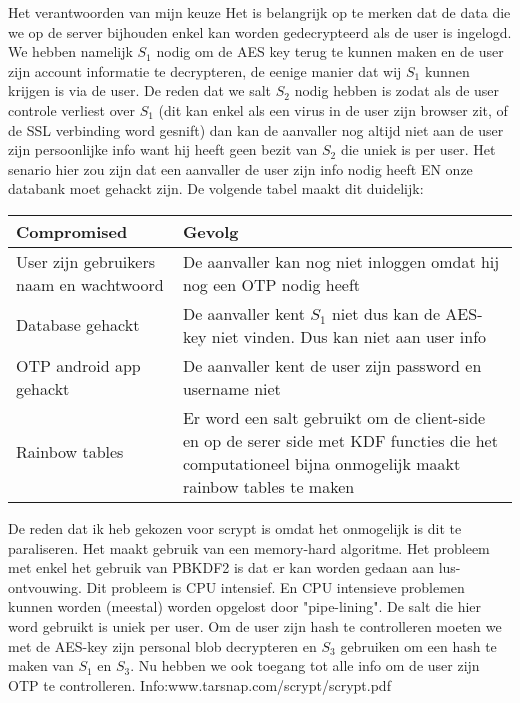\documentclass[10pt,a4paper]{report}
\begin{document}
\begin{subsection}{Het verantwoorden van mijn keuze}
Het is belangrijk op te merken dat de data die we op de server bijhouden enkel kan worden gedecrypteerd als de user is ingelogd. We hebben namelijk $S_1$ nodig om de AES key terug te kunnen maken en de user zijn account informatie te decrypteren, de eenige manier dat wij $S_1$ kunnen krijgen is via de user. De reden dat we salt $S_2$ nodig hebben is zodat als de user controle verliest over $S_1$ (dit kan enkel als een virus in de user zijn browser zit, of de SSL verbinding word gesnift) dan kan de aanvaller nog altijd niet aan de user zijn persoonlijke info want hij heeft geen bezit van $S_2$ die uniek is per user. Het senario hier zou zijn dat een aanvaller de user zijn info nodig heeft EN onze databank moet gehackt zijn. De volgende tabel maakt dit duidelijk:
\begin{tabular}{|l|p{5cm}}
\hline 
Compromised & Gevolg \\ 
\hline 
User zijn gebruikers naam en wachtwoord & De aanvaller kan nog niet inloggen omdat hij nog een OTP nodig heeft \\ 
\hline 
Database gehackt & De aanvaller kent $S_1$ niet dus kan de AES-key niet vinden. Dus kan niet aan user info \\ 
\hline 
OTP android app gehackt & De aanvaller kent de user zijn password en username niet \\ 
\hline 
Rainbow tables & Er word een salt gebruikt om de client-side en op de serer side met KDF functies die het computationeel bijna onmogelijk maakt rainbow tables te maken \\ 
\hline 
\end{tabular} 
De reden dat ik heb gekozen voor scrypt is omdat het onmogelijk is dit te paraliseren. Het maakt gebruik van een memory-hard algoritme. Het probleem met enkel het gebruik van PBKDF2 is dat er kan worden gedaan aan lus-ontvouwing. Dit probleem is CPU intensief. En CPU intensieve problemen kunnen worden (meestal) worden opgelost door "pipe-lining". De salt die hier word gebruikt is uniek per user.
Om de user zijn hash te controlleren moeten we met de AES-key zijn personal blob decrypteren en $S_3$ gebruiken om een hash te maken van $S_1$ en $S_3$. Nu hebben we ook toegang tot alle info om de user zijn OTP te controlleren.
Info:www.tarsnap.com/scrypt/scrypt.pdf
\end{subsection}
\end{document}
